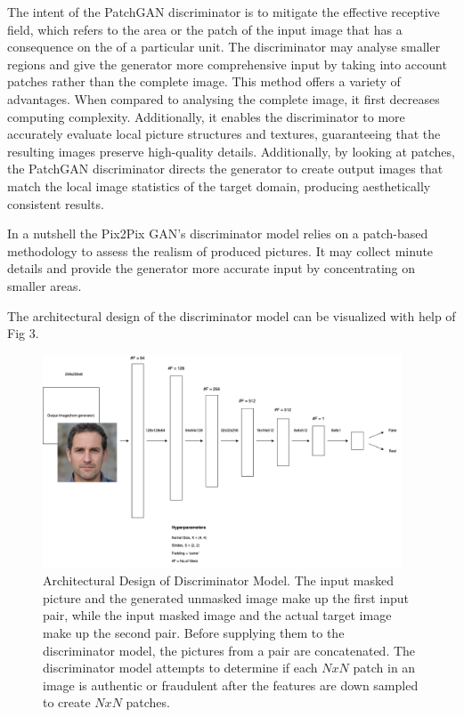 \documentclass{36_styles/svproc}
\begin{document}
The intent of the PatchGAN discriminator is to mitigate the effective receptive field, which refers to the area or the patch of the input image that has a consequence on the of a particular unit. The discriminator may analyse smaller regions and give the generator more comprehensive input by taking into account patches rather than the complete image. This method offers a variety of advantages. When compared to analysing the complete image, it first decreases computing complexity. Additionally, it enables the discriminator to more accurately evaluate local picture structures and textures, guaranteeing that the resulting images preserve high-quality details. Additionally, by looking at patches, the PatchGAN discriminator directs the generator to create output images that match the local image statistics of the target domain, producing aesthetically consistent results.

In a nutshell the Pix2Pix GAN's discriminator model relies on a patch-based methodology to assess the realism of produced pictures. It may collect minute details and provide the generator more accurate input by concentrating on smaller areas.

The architectural design of the discriminator model can be visualized with help of Fig 3.

\begin{figure}[ht]%
\centering
\includegraphics[width=0.95\textwidth]{36_figures/discriminator.png}
\caption{Architectural Design of Discriminator Model. The input masked picture and the generated unmasked image make up the first input pair, while the input masked image and the actual target image make up the second pair. Before supplying them to the discriminator model, the pictures from a pair are concatenated. The discriminator model attempts to determine if each $NxN$ patch in an image is authentic or fraudulent after the features are down sampled to create $NxN$ patches.}\label{fig3}
\end{figure}
\end{document}
